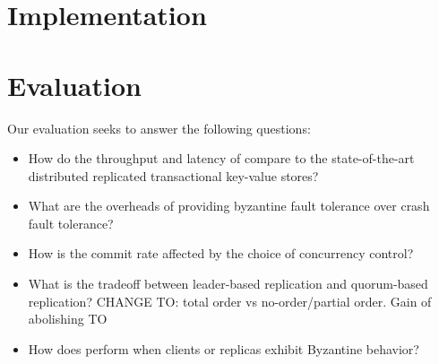 \section{Implementation}

\section{Evaluation}

Our evaluation seeks to answer the following questions:
\begin{itemize}
  \item How do the throughput and latency of \sys{} compare to the
    state-of-the-art distributed replicated transactional key-value
    stores?
  \item What are the overheads of providing byzantine fault tolerance over
    crash fault tolerance?
  \item How is the commit rate affected by the choice of concurrency control?
  \item What is the tradeoff between leader-based replication and quorum-based
    replication? CHANGE TO: total order vs no-order/partial order. Gain of abolishing TO
  \item How does \sys{} perform when clients or replicas exhibit Byzantine
    behavior?
\end{itemize}

